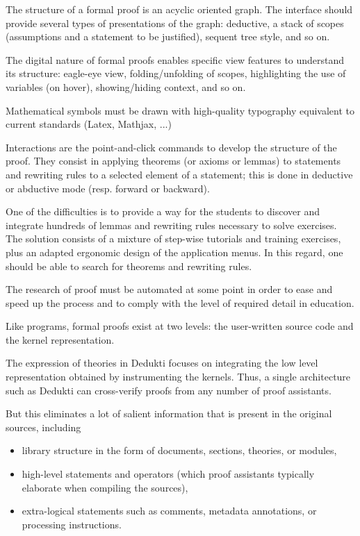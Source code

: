 The structure of a formal proof is an acyclic oriented graph.
The interface should provide several types of presentations of the graph:
deductive, a stack of scopes (assumptions and a statement to be justified),
sequent tree style, and so on.

The digital nature of formal proofs enables specific view features
to understand its structure: eagle-eye view, folding/unfolding of
scopes, highlighting the use of variables (on hover), showing/hiding
context, and so on.

Mathematical symbols must be drawn with high-quality typography equivalent
to current standards (Latex, Mathjax, ...)

Interactions are the point-and-click commands to develop the structure
of the proof. They consist in applying theorems (or axioms or lemmas)
to statements and rewriting rules to a selected element of a
statement; this is done in deductive or abductive mode (resp. forward
or backward).

One of the difficulties is to provide a way for the students to discover
and integrate hundreds of lemmas and rewriting rules necessary to solve
exercises. The solution consists of a mixture of step-wise tutorials and
training exercises, plus an adapted ergonomic design of the application menus.
In this regard, one should be able to search for theorems and rewriting rules.

The research of proof must be automated at some point in order to ease and
speed up the process and to comply with the level of required detail in education.



Like programs, formal proofs exist at two levels: the user-written
source code and the kernel representation.

The expression of theories in Dedukti focuses on integrating the low
level representation obtained by instrumenting the kernels.  Thus, a
single architecture such as Dedukti can cross-verify proofs from any
number of proof assistants.

But this eliminates a lot of salient information that is present in
the original sources, including
\begin{itemize}
\item library structure in the form of documents, sections,
  theories, or modules,

\item high-level statements and operators (which proof assistants
  typically elaborate when compiling the sources),

\item extra-logical statements such as comments, metadata annotations,
  or processing instructions.
\end{itemize}

